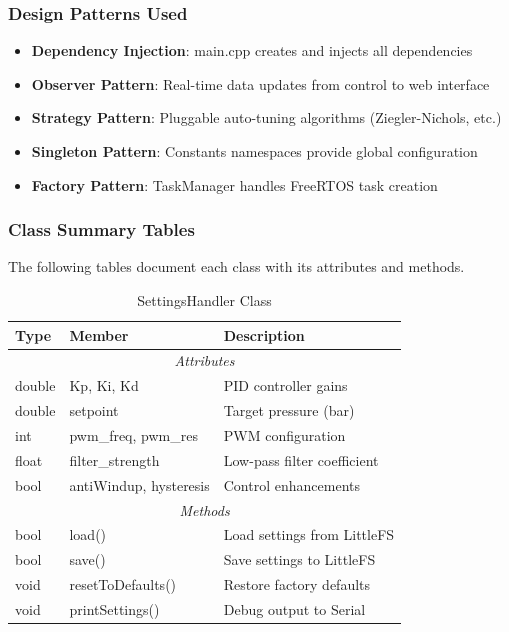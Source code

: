 \documentclass[12pt,a4paper]{article}
\begin{document}
\subsubsection{Design Patterns Used}
\begin{itemize}
    \item \textbf{Dependency Injection}: main.cpp creates and injects all dependencies
    \item \textbf{Observer Pattern}: Real-time data updates from control to web interface
    \item \textbf{Strategy Pattern}: Pluggable auto-tuning algorithms (Ziegler-Nichols, etc.)
    \item \textbf{Singleton Pattern}: Constants namespaces provide global configuration
    \item \textbf{Factory Pattern}: TaskManager handles FreeRTOS task creation
\end{itemize}

\subsubsection{Class Summary Tables}
The following tables document each class with its attributes and methods.

\begin{table}[H]
\centering
\caption{SettingsHandler Class}
\label{tab:settings-handler}
\begin{tabular}{|l|l|p{6cm}|}
\hline
\textbf{Type} & \textbf{Member} & \textbf{Description} \\
\hline
\multicolumn{3}{|c|}{\textit{Attributes}} \\
\hline
double & Kp, Ki, Kd & PID controller gains \\
double & setpoint & Target pressure (bar) \\
int & pwm\_freq, pwm\_res & PWM configuration \\
float & filter\_strength & Low-pass filter coefficient \\
bool & antiWindup, hysteresis & Control enhancements \\
\hline
\multicolumn{3}{|c|}{\textit{Methods}} \\
\hline
bool & load() & Load settings from LittleFS \\
bool & save() & Save settings to LittleFS \\
void & resetToDefaults() & Restore factory defaults \\
void & printSettings() & Debug output to Serial \\
\hline
\end{tabular}
\end{table}
\end{document}
